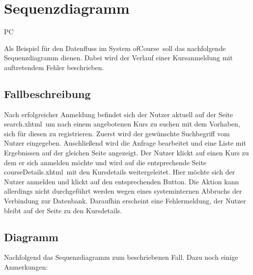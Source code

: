 \chapter{Sequenzdiagramm}

\begin{tiny}
PC
\end{tiny}

Als Beispiel für den Datenfluss im System \grqq ofCourse\grqq\ soll das nachfolgende Sequenzdiagramm dienen. Dabei wird der Verlauf einer Kursanmeldung mit auftretendem Fehler beschrieben.

\section{Fallbeschreibung}

Nach erfolgreicher Anmeldung befindet sich der Nutzer aktuell auf der Seite \grqq search.xhtml\grqq\ um nach einem angebotenen Kurs zu suchen mit dem Vorhaben, sich für diesen zu registrieren. Zuerst wird der gewünschte Suchbegriff vom Nutzer eingegeben. Anschließend wird die Anfrage bearbeitet und eine Liste mit Ergebnissen auf der gleichen Seite angezeigt. Der Nutzer klickt auf einen Kurs zu dem er sich anmelden möchte und wird auf die entsprechende Seite \grqq courseDetails.xhtml\grqq\ mit den Kursdetails weitergeleitet. Hier möchte sich der Nutzer anmelden und klickt auf den entsprechenden Button. Die Aktion kann allerdings nicht durchgeführt werden wegen eines systeminternen Abbruchs der Verbindung zur Datenbank. Daraufhin erscheint eine Fehlermeldung, der Nutzer bleibt auf der Seite zu den Kursdetails.

\section{Diagramm}

Nachfolgend das Sequenzdiagramm zum beschriebenen Fall. Dazu noch einige Anmerkungen:

